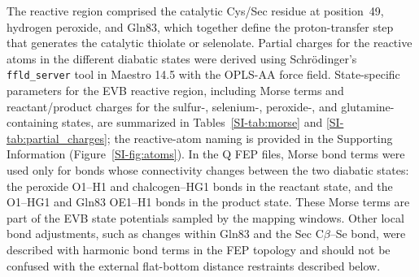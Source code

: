 The reactive region comprised the catalytic Cys/Sec residue at position~49, hydrogen peroxide, and Gln83, which together define the proton-transfer step that generates the catalytic thiolate or selenolate. Partial charges for the reactive atoms in the different diabatic states were derived using Schrödinger's \texttt{ffld\_server} tool in Maestro 14.5 with the OPLS-AA force field.\cite{Schrodinger2024Maestro} State-specific parameters for the EVB reactive region, including Morse terms and reactant/product charges for the sulfur-, selenium-, peroxide-, and glutamine-containing states, are summarized in Tables~\ref{SI-tab:morse} and \ref{SI-tab:partial_charges}; the reactive-atom naming is provided in the Supporting Information (Figure~\ref{SI-fig:atoms}). In the Q FEP files, Morse bond terms were used only for bonds whose connectivity changes between the two diabatic states: the peroxide O1--H1 and chalcogen--HG1 bonds in the reactant state, and the O1--HG1 and Gln83 OE1--H1 bonds in the product state. These Morse terms are part of the EVB state potentials sampled by the mapping windows. Other local bond adjustments, such as changes within Gln83 and the Sec C$\beta$--Se bond, were described with harmonic bond terms in the FEP topology and should not be confused with the external flat-bottom distance restraints described below.

